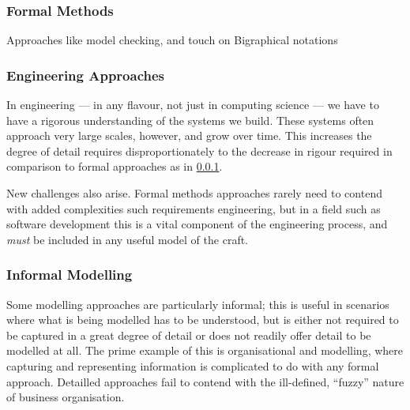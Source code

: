 \subsubsection{Formal Methods}\label{sec:review-formal-methods}

Approaches like model checking, and touch on Bigraphical notations
\par

\subsubsection{Engineering Approaches}

In engineering --- in any flavour, not just in computing science --- we have to have a rigorous understanding of the systems we build. 
These systems often approach very large scales, however, and grow over time.
This increases the degree of detail requires disproportionately to the decrease in rigour required in comparison to formal approaches as in \ref{sec:review-formal-methods}.
\par

New challenges also arise. Formal methods approaches rarely need to contend with added complexities such requirements engineering, but in a field such as software development this is a vital component of the engineering process, and \emph{must} be included in any useful model of the craft.
\par


\subsubsection{Informal Modelling}
Some modelling approaches are particularly informal; this is useful in scenarios where what is being modelled has to be understood, but is either not required to be captured in a great degree of detail or does not readily offer detail to be modelled at all.
The prime example of this is organisational and modelling, where capturing and representing information is complicated to do with any formal approach.
Detailled approaches fail to contend with the ill-defined, ``fuzzy'' nature of business organisation.
\par

